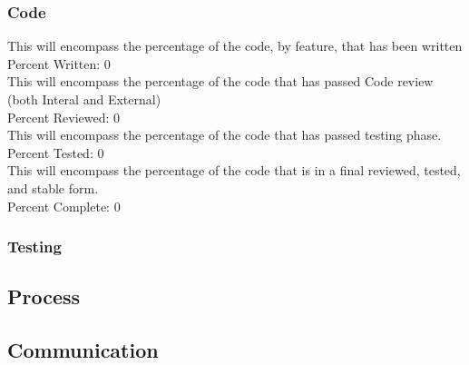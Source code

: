 \documentclass{article}
\begin{document}
\subsubsection{Code}
This will encompass the percentage of the code, by feature, that has been written\\
Percent Written:	0\\
This will encompass the percentage of the code that has passed Code review (both Interal and External)\\
Percent Reviewed:	0\\
This will encompass the percentage of the code that has passed testing phase.\\
Percent Tested:		0\\
This will encompass the percentage of the code that is in a final reviewed, tested, and stable form.\\
Percent Complete:	0\\


\subsubsection{Testing}
\subsection{Process}
\subsection{Communication}
\end{document}
